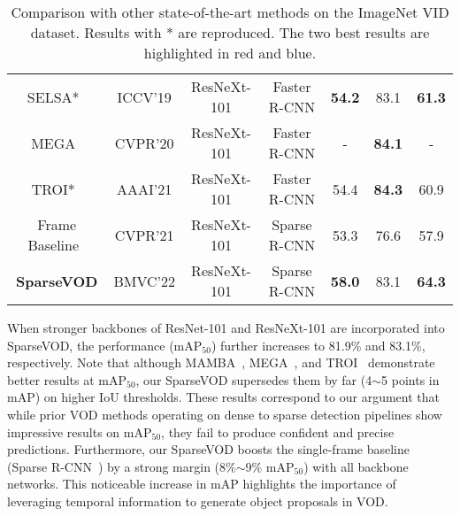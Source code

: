 \documentclass{bmvc2k}
\begin{document}
\begin{table}
\begin{center}
\begin{tabular}{ccccccc}
SELSA*~\cite{wu2019sequence}  & ICCV'19 & ResNeXt-101 & Faster R-CNN& \textbf{\color{blue}  54.2} & 83.1 &  \textbf{\color{blue} 61.3}  \\
MEGA~\cite{chen2020memory}  & CVPR'20 & ResNeXt-101 & Faster R-CNN  & - & \textbf{\color{blue}84.1}& -\\
TROI*~\cite{gong2021temporal}  & AAAI'21 & ResNeXt-101 & Faster R-CNN  & 54.4 & \textbf{\color{red} 84.3} & 60.9\\
\hline
{Frame Baseline~\cite{sun2021sparse}}& CVPR'21 & ResNeXt-101 & Sparse R-CNN & 53.3 & 76.6 & 57.9 \\
{\textbf{SparseVOD} }& BMVC'22 & ResNeXt-101 & Sparse R-CNN  & \textbf{\color{red}58.0} & 83.1 & \textbf{\color{red}64.3}\\
\bottomrule
\end{tabular}
\end{center}
\caption{Comparison with other state-of-the-art methods on the ImageNet VID dataset. Results with * are reproduced. The two best results are highlighted in red and blue.}
\label{table:sota_comparison}
\vspace{-20pt}
\end{table}

When stronger backbones of ResNet-101 and ResNeXt-101 are incorporated into SparseVOD, the performance (mAP$_{50}$) further increases to 81.9\% and 83.1\%, respectively. Note that although MAMBA~\cite{sun2021mamba}, MEGA~\cite{chen2020memory}, and TROI~\cite{gong2021temporal} demonstrate better results at mAP$_{50}$, our SparseVOD supersedes them by far (4$\sim$5 points in mAP) on higher IoU thresholds. These results correspond to our argument that while prior VOD methods operating on dense to sparse detection pipelines show impressive results on mAP$_{50}$, they fail to produce confident and precise predictions. Furthermore, our SparseVOD boosts the single-frame baseline (Sparse R-CNN~\cite{sun2021sparse}) by a strong margin (8\%$\sim$9\% mAP$_{50}$) with all backbone networks. This noticeable increase in mAP highlights the importance of leveraging temporal information to generate object proposals in VOD.
\vspace{-5pt}
\end{document}
